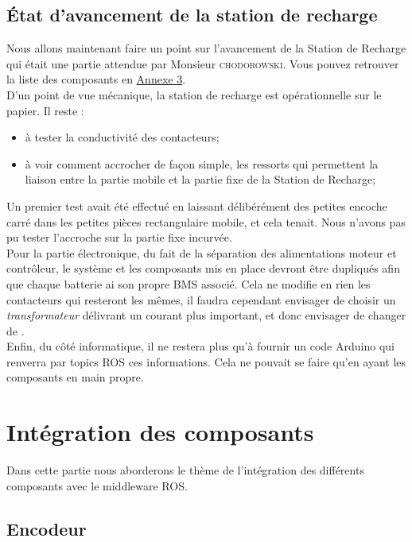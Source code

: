 \documentclass[french]{rapportENSTAB}
\begin{document}
\subsection{État d'avancement de la station de recharge} \label{station}
Nous allons maintenant faire un point sur l'avancement  de la Station de Recharge qui était une partie attendue par Monsieur \textsc{chodorowski}. Vous pouvez retrouver la liste des composants en \hyperlink{annexe3}{Annexe 3}.\\

D'un point de vue mécanique, la station de recharge est opérationnelle sur le papier. Il reste : \begin{itemize}[label=\textbullet, font=\small\color{blue}]
    \item à tester la conductivité des contacteurs;
    \item à voir comment accrocher de façon simple, les ressorts qui permettent la liaison entre la partie mobile et la partie fixe de la Station de Recharge;
\end{itemize} 
Un premier test avait été effectué en laissant délibérément des petites encoche carré dans les petites pièces rectangulaire mobile, et cela tenait. Nous n'avons pas pu tester l'accroche sur la partie fixe incurvée.\\

Pour la partie électronique, du fait de la séparation des alimentations moteur et contrôleur, le système et les composants mis en place devront être dupliqués afin que chaque batterie ai son propre BMS associé. Cela ne modifie en rien les contacteurs qui resteront les mêmes, il faudra cependant envisager de choisir un \textit{transformateur} délivrant un courant plus important, et donc envisager de changer de .\\

Enfin, du côté informatique, il ne restera plus qu'à fournir un code Arduino qui renverra par topics ROS ces informations. Cela ne pouvait se faire qu'en ayant les composants en main propre.

\pagebreak
\section{Intégration des composants}
Dans cette partie nous aborderons le thème de l'intégration des différents composants avec le middleware ROS.


\subsection{Encodeur}
\end{document}
